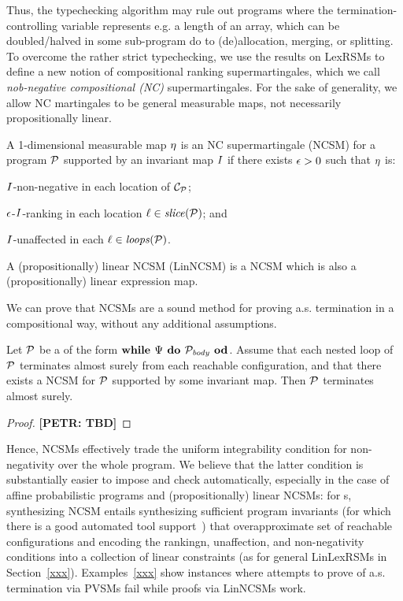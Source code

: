 Thus, the typechecking algorithm may rule out programs where the termination-controlling variable represents e.g. a length of an array, which can be doubled/halved in some sub-program do to (de)allocation, merging, or splitting.
To overcome the rather strict typechecking, we use the results on LexRSMs to define a new notion of compositional ranking supermartingales, which we call \emph{nob-negative compositional (NC)} supermartingales. For the sake of generality, we allow NC martingales to be general measurable maps, not necessarily propositionally linear.

\begin{definition}
\label{def:nonneg-comp}
A 1-dimensional measurable map $\eta$ is an NC supermartingale (NCSM) for a program $\mathcal{P}$ supported by an invariant map $I$ if there exists $\epsilon>0$ such that $\eta$ is:
\begin{compactenum}
\item  $I$-non-negative in each location of $\mathcal{C}_{\mathcal{P}}$;
\item 
 $\epsilon$-$I$-ranking in each location $\ell\in\mathit{slice}{(\mathcal{P})}$; and
\item 
  $I$-unaffected in each $\ell\in\mathit{loops}(\mathcal{P})$.
\end{compactenum}
A (propositionally) linear NCSM (LinNCSM) is a NCSM which is also a (propositionally) linear expression map.
\end{definition}

We can prove that NCSMs are a sound method for proving a.s. termination in a compositional way, without any additional assumptions.

\begin{theorem}
\label{thm:nonneg-comp}
Let $\mathcal{P}$ be a \PP{} of the form $\textbf{while } \Psi \textbf{ do } 
\mathcal{P}_{\mathit{body}} \textbf{ od}$. Assume that each nested loop of $\mathcal{P}$ terminates almost surely from each reachable configuration, and that there exists a NCSM for $\mathcal{P}$ supported by some invariant map. Then $\mathcal{P}$ terminates almost surely.
\end{theorem}
\begin{proof}
\textbf{[PETR: TBD]}
\end{proof}

Hence, NCSMs effectively trade the uniform integrability condition for non-negativity over the whole program. We believe that the latter condition is substantially easier to impose and check automatically, especially in the case of affine probabilistic programs and (propositionally) linear NCSMs: for \APP{}s, synthesizing NCSM entails synthesizing sufficient program invariants (for which there is a good automated tool support~\cite{xxx}) that overapproximate set of reachable configurations and encoding the rankingn, unaffection, and non-negativity conditions into a collection of linear constraints (as for general LinLexRSMs in Section~\ref{xxx}). Examples~\ref{xxx} show instances where attempts to prove of a.s. termination via PVSMs fail while proofs via LinNCSMs work. 

